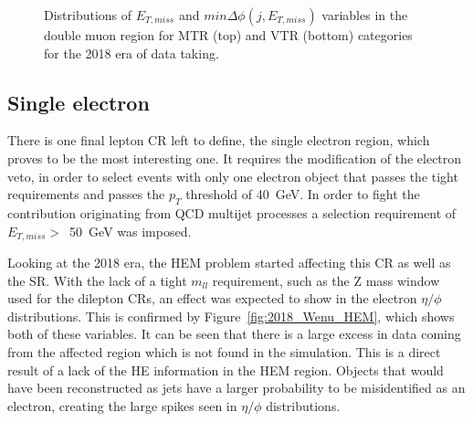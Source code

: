 \begin{figure}[htbp]
{    }
  \caption{Distributions of $E_{T,miss}$ and $min\Delta\phi(j,E_{T,miss})$ variables in the double muon region for MTR (top) and VTR (bottom) categories for the 2018 era of data taking.}
  \label{fig:2018_Zee_2}
\end{figure}


\subsection{Single electron}
\label{sec:single_electron}
\hspace{10pt} There is one final lepton CR left to define, the single electron region, which proves to be the most interesting one. It requires the modification of the electron veto, in order to select events with only one electron object that passes the tight requirements and passes the $p_T$ threshold of 40~GeV. In order to fight the contribution originating from QCD multijet processes a selection requirement of $E_{T,miss}>$~50~GeV was imposed.

\hspace{10pt} Looking at the 2018 era, the HEM problem started affecting this CR as well as the SR. With the lack of a tight $m_{ll}$ requirement, such as the Z mass window used for the dilepton CRs, an effect was expected to show in the electron $\eta/\phi$ distributions. This is confirmed by Figure~\ref{fig:2018_Wenu_HEM}, which shows both of these variables. It can be seen that there is a large excess in data coming from the affected region which is not found in the simulation. This is a direct result of a lack of the HE information in the HEM region. Objects that would have been reconstructed as jets have a larger probability to be misidentified as an electron, creating the large spikes seen in $\eta/\phi$ distributions.

